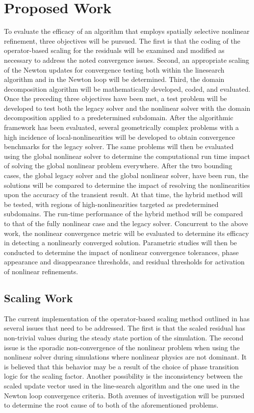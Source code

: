 \chapter{Proposed Work}
\label{chap:proposal}
To evaluate the efficacy of an algorithm that employs  spatially selective nonlinear refinement, three objectives will be pursued.
The first is that the coding of the operator-based scaling for the residuals will be examined and modified as necessary to address the noted convergence issues.
Second, an appropriate scaling of the Newton updates for convergence testing both within the linesearch algorithm and in the Newton loop will be determined.
Third, the domain decomposition algorithm will be mathematically developed, coded, and evaluated.
Once the preceding three objectives have been met, a test problem will be developed to test both the legacy solver and the nonlinear solver with the domain decomposition applied to a predetermined subdomain.
After the algorithmic framework has been evaluated, several geometrically complex problems with a high incidence of local-nonlinearities will be developed to obtain convergence benchmarks for the legacy solver.
The same problems will then be evaluated using the global nonlinear solver to determine the computational run time impact of solving the global nonlinear problem everywhere. 
After the two bounding cases, the global legacy solver and the global nonlinear solver, have been run, the solutions will be compared to determine the impact of resolving the nonlinearities upon the accuracy of the transient result.
At that time, the hybrid method will be tested, with regions of high-nonlinearities targeted as predetermined subdomains.
The run-time performance of the hybrid method will be compared to that of the fully nonlinear case and the legacy solver.
Concurrent to the above work, the nonlinear convergence metric will be evaluated to determine its efficacy in detecting a nonlinearly converged solution.
Parametric studies will then be conducted to determine the impact of nonlinear convergence tolerances, phase appearance and disappearance thresholds, and residual thresholds for activation of nonlinear refinements.

\section{Scaling Work}
\label{sect:proposal_scaling}
The current implementation of the operator-based scaling method outlined in  has several issues that need to be addressed.
The first is that the scaled residual has non-trivial values during the steady state portion of the simulation.
The second issue is the sporadic non-convergence of the nonlinear problem when using the nonlinear solver during simulations where nonlinear physics are not dominant.
It is believed that this behavior may be a result of the choice of phase transition logic for the scaling factor.
Another possibility is the inconsistency between the scaled update vector used in the line-search algorithm and the one used in the Newton loop convergence criteria.
Both avenues of investigation will be pursued to determine the root cause of to both of the aforementioned problems.

